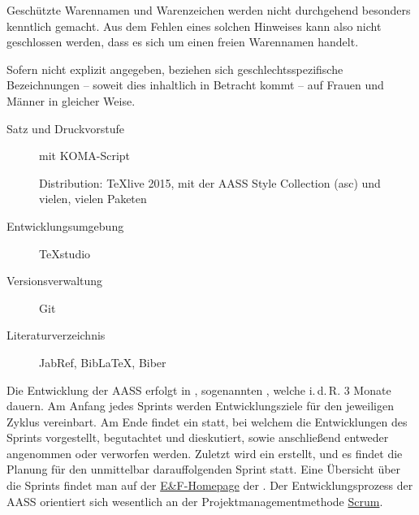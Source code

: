 Geschützte Warennamen und Warenzeichen werden nicht durchgehend besonders
kenntlich gemacht. Aus dem Fehlen eines solchen Hinweises kann also
nicht geschlossen werden, dass es sich um einen freien Warennamen
handelt.

Sofern nicht explizit angegeben, beziehen sich 
geschlechtsspezifische Bezeichnungen -- soweit dies
inhaltlich in Betracht kommt -- auf Frauen und Männer in
gleicher Weise.


\begin{description}
  \item[Satz und Druckvorstufe] \LuaLaTeX{} mit {\sffamily KOMA-Script}
  
  Distribution: \TeX live 2015, mit der AASS
  Style Collection (asc) und vielen, vielen Paketen
  \item[Entwicklungsumgebung] TeXstudio
  \item[Versionsverwaltung] Git
  \item[Literaturverzeichnis] JabRef, BibLaTeX, Biber
\end{description}


\bigskip


Die Entwicklung der AASS erfolgt in , 
sogenannten , welche i.\,d.\,R. 3 Monate dauern. Am Anfang 
jedes Sprints werden Entwicklungsziele für den jeweiligen Zyklus vereinbart. Am 
Ende findet ein  statt, bei welchem die Entwicklungen des Sprints 
vorgestellt, begutachtet und dieskutiert, sowie anschließend entweder 
angenommen oder verworfen werden. Zuletzt wird ein  
erstellt, 
und es findet die Planung für den unmittelbar darauffolgenden Sprint statt. 
Eine Übersicht über die Sprints findet man auf der 
\href{http://aass.at/entwicklung/projects/aass/wiki/Sprints}{E\&F-Homepage} der 
{\AASS}.
Der Entwicklungsprozess der AASS orientiert sich wesentlich an der 
Projektmanagementmethode \href{http://de.wikipedia.org/wiki/Scrum}{Scrum}.


